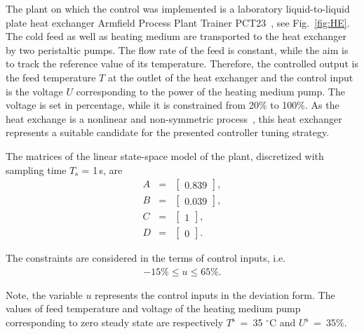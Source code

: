 \documentclass[preprint,12pt]{elsarticle}
\begin{document}
The plant on which the control was implemented is a laboratory liquid-to-liquid plate heat exchanger Armfield Process Plant Trainer PCT23~\cite{pct23}, see Fig.~\ref{fig:HE}. The cold feed as well as heating medium are transported to the heat exchanger by two peristaltic pumps. The flow rate of the feed is constant, while the aim is to track the reference value of its temperature. Therefore, the controlled output is the feed temperature $T$ at the outlet of the heat exchanger and the control input is the voltage $U$ corresponding to the power of the heating medium pump. The voltage is set in percentage, while it is constrained from 20\% to 100\%. As the heat exchange is a nonlinear and non-symmetric process~\cite{Liptak}, this heat exchanger represents a suitable candidate for the presented controller tuning strategy.  

The matrices of the linear state-space model of the plant, discretized with sampling time $T_\mathrm{s}$ = 1\,s, are
\begin{subequations}
	\label{eq:model_A_B} 
	\begin{eqnarray}
		A&=&\begin{bmatrix}
			0.839
		\end{bmatrix}, \\
		B&=&\begin{bmatrix}
			0.039
		\end{bmatrix}, \\
		C&=&\begin{bmatrix}
			1
		\end{bmatrix}, \\
		D&=&\begin{bmatrix}
			0
		\end{bmatrix}.
		\end{eqnarray}
\end{subequations}

The constraints are considered in the terms of control inputs, i.e.
\begin{eqnarray}
\label{eq:u_const}
	-15\% \le u \le 65\%.
\end{eqnarray}

Note, the variable $u$ represents the control inputs in the deviation form. The values of feed temperature and voltage of the heating medium pump corresponding to zero steady state are respectively $T^\mathrm{s}$~=~35 $^{\circ}\mathrm{C}$ and $U^\mathrm{s}$~=~35\%.
\end{document}
